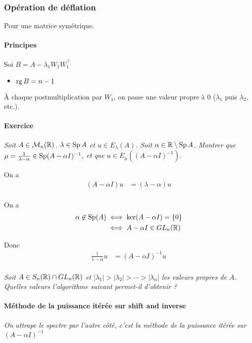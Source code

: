 \documentclass{article}
\begin{document}
\subsubsection{Opération de déflation}

Pour une matrice symétrique.

\paragraph{Principes}

Soi $B = A - \lambda_1 W_1 W_1^\top$

\begin{itemize}
	\item $\operatorname{rg} B = n - 1$ 
\end{itemize}

À chaque postmultiplication par $W_1$, on passe une valeur propre à 0 ($\lambda_1$ puis $\lambda_2$, etc.).

\paragraph{Exercice}

\emph{Soit $A\in \mathcal{M}_n(\mathbb{R})$. $\lambda\in \operatorname{Sp} A$ et $u\in E_{\lambda}(A)$. Soit $\alpha\in \mathbb{R} \setminus \operatorname{Sp} A$. Montrer que $\mu = \frac{1}{\lambda-\alpha} \in \operatorname{Sp}(A-\alpha I)^{-1}$, et que $u\in E_{\mu}((A-\alpha I)^{-1})$}.

On a 
\begin{align*}
	(A - \alpha I) u &= (\lambda - \alpha) u \\
\end{align*}

On a \begin{align*}
	\alpha \not\in \operatorname{Sp}(A) &\iff \ker (A - \alpha I) = \{0\} \\
			      &\iff A - \alpha I \in GL_n(\mathbb{R})
\end{align*}

Donc \begin{align*}
	\frac{1}{1-\alpha} u &= (A - \alpha I)^{-1} u \\
\end{align*}

\emph{Soit $A \in S_n(\mathbb{R}) \cap GL_n(\mathbb{R})$ et $|\lambda_1| > |\lambda_2| > \cdots > |\lambda_n|$ les valeurs propres de $A$. Quelles valeurs l'algorithme suivant permet-il d'obtenir ?} 

\paragraph{Méthode de la puissance itérée sur shift and inverse}
\emph{On attrape le spectre par l'autre côté, c'est la méthode de la puissance itérée sur $(A - \alpha I)^{-1}$} 
\end{document}
